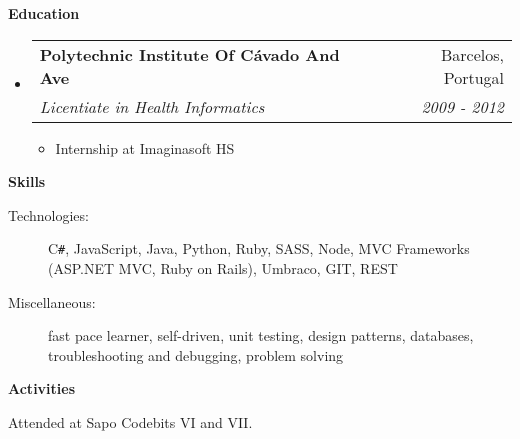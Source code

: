 \documentclass[letterpaper,11pt]{article}
\makeatletter
\newcommand{\resitem}[1]{\item #1 \vspace{-2pt}}
\newcommand{\resheading}[1]{{\large \colorbox{mygrey}{\begin{minipage}{\textwidth}{\textbf{#1 \vphantom{p\^{E}}}}\end{minipage}}}}
\newcommand{\ressubheading}[4]{
\begin{tabular*}{7.0in}{l@{\extracolsep{\fill}}r}
		\textbf{#1} & #2 \\
		\textit{#3} & \textit{#4} \\
\end{tabular*}\vspace{-6pt}}
\makeatother
\begin{document}
\resheading{Education}
\begin{itemize}
	\item
	\ressubheading{Polytechnic Institute Of Cávado And Ave}{Barcelos, Portugal}{Licentiate in Health Informatics}{2009 - 2012}
	\begin{itemize}
		\resitem{Internship at Imaginasoft HS}
	\end{itemize}
	
\end{itemize}


\resheading{Skills}

\begin{description}
\item[Technologies:]
C{}\verb!#!, JavaScript, Java, Python, Ruby, SASS, Node, MVC Frameworks (ASP.NET MVC, Ruby on Rails), Umbraco, GIT, REST
\item[Miscellaneous:]
fast pace learner, self-driven, unit testing, design patterns, databases, troubleshooting and debugging, problem solving
\end{description}	

\resheading{Activities}

\begin{description}
\item[Attended at Sapo Codebits VI and VII.]
\end{description}
\end{document}
